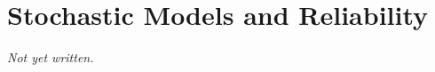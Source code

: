 \chapter{Stochastic Models and Reliability}\label{ch:stochastic-models}


\textit{Not yet written.}

